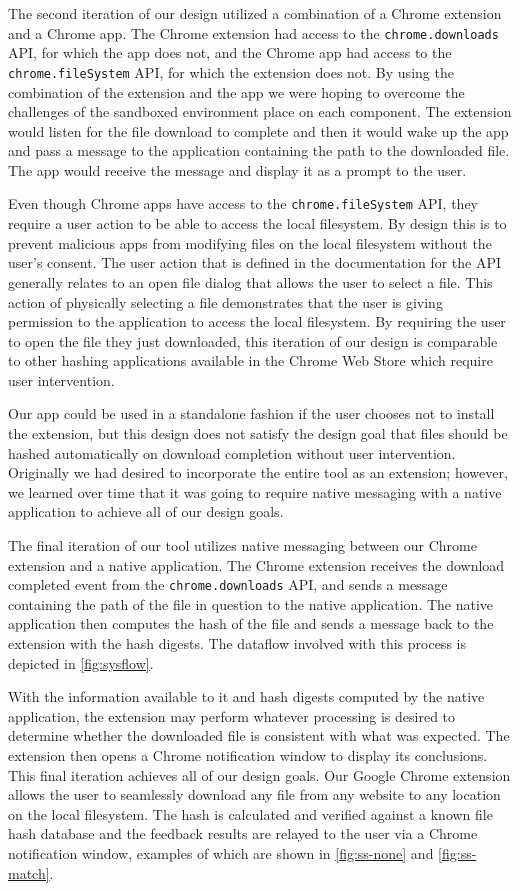 \documentclass[letterpaper,twocolumn,10pt]{article}
\begin{document}
The second iteration of our design utilized a combination of a Chrome extension and a Chrome app.
The Chrome extension had access to the \texttt{chrome.downloads} API, for which the app does not,
and the Chrome app had access to the \texttt{chrome.fileSystem} API, for which the extension does not.
By using the combination of the extension and the app we were hoping to overcome the challenges of the
sandboxed environment place on each component. The extension would listen for the file download to
complete and then it would wake up the app and pass a message to the application containing the
path to the downloaded file. The app would receive the message and display it as a prompt to the user.

Even though Chrome apps have access to the \texttt{chrome.fileSystem} API, they require a user
action to be able to access the local filesystem. By design this is to prevent malicious apps from
modifying files on the local filesystem without the user’s consent. The user action that is defined
in the documentation for the API generally relates to an open file dialog that allows the user to select
a file. This action of physically selecting a file demonstrates that the user is giving permission to the
application to access the local filesystem. By requiring the user to open the file they just downloaded,
this iteration of our design is comparable to other hashing applications available in the Chrome
Web Store which require user intervention. 

Our app could be used in a standalone fashion if
the user chooses not to install the extension, but this design does not satisfy the design goal
that files should be hashed automatically on download completion without user intervention.
Originally we had desired to incorporate the entire tool as an extension; however, we learned
over time that it was going to require native messaging with a native application to achieve all
of our design goals.

The final iteration of our tool utilizes native messaging between our Chrome extension and a
native application. The Chrome extension receives the download completed event from the
\texttt{chrome.downloads} API, and sends a message containing the path of the file in question
to the native application. The native application then computes the hash of the file and
sends a message back to the extension with the hash digests. The dataflow involved with this
process is depicted in \autoref{fig:sysflow}.

With the information available to it and hash digests computed by the native application,
the extension may perform whatever processing is desired to determine whether the
downloaded file is consistent with what was expected.
The extension then opens a Chrome notification window to display its conclusions.
This final iteration achieves all of our design goals. Our Google Chrome extension allows
the user to seamlessly download any file from any website to any location on the local
filesystem. The hash is calculated and verified against a known file hash database and
the feedback results are relayed to the user via a Chrome notification window, examples
of which are shown in \autoref{fig:ss-none} and \autoref{fig:ss-match}.
\end{document}
